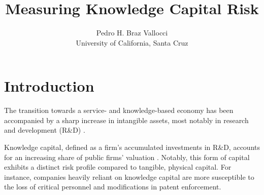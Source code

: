 \documentclass[12pt, letterpaper]{article}
\begin{document}
\title{Measuring Knowledge Capital Risk} %
\author{Pedro H. Braz Vallocci \\ University of California, Santa Cruz} %

\newcommand{\ffo}{dicfullmc10thr10defnob5noa0_8_4t}

\newcommand{\insertfigure}[3]{
\begin{figure}[H]
  \centering
  \texttt{[image: \\ffo/\#1]}
  \caption{#2}
  \label{fig:#1}
\end{figure}
}


\newcommand{\tkk}{\texttt{topic\_kk }}

\maketitle %

\onehalfspacing %

\section{Introduction}

The transition towards a service- and knowledge-based economy has been accompanied by a sharp increase in intangible assets, most notably in research and development (R\&D) \citep{Corrado2009-kd}.

Knowledge capital, defined as a firm's accumulated investments in R\&D, accounts for an increasing share of public firms' valuation \citep{Belo2019-iz}. Notably, this form of capital exhibits a distinct risk profile compared to tangible, physical capital. For instance, companies heavily reliant on knowledge capital are more susceptible to the loss of critical personnel and modifications in patent enforcement. 
\end{document}
